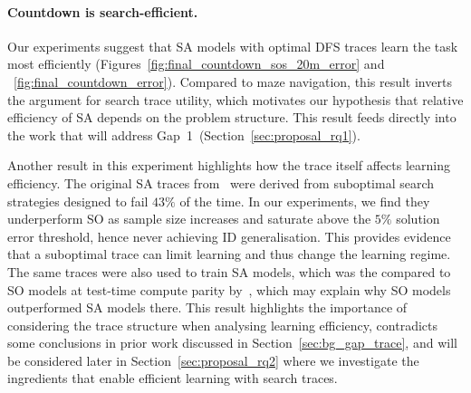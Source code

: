 \paragraph{Countdown is search-efficient.}
Our experiments suggest that SA models with optimal DFS traces learn the task most efficiently (Figures~\ref{fig:final_countdown_sos_20m_error} and ~\ref{fig:final_countdown_error}).
Compared to maze navigation, this result inverts the argument for search trace utility, which motivates our hypothesis that relative efficiency of SA depends on the problem structure.
This result feeds directly into the work that will address Gap~1~(Section~\ref{sec:proposal_rq1}).

Another result in this experiment highlights how the trace itself affects learning efficiency.
The original SA traces from~\citet{gandhiStreamSearchSoS2024} were derived from suboptimal search strategies designed to fail $43\%$ of the time.
In our experiments, we find they underperform SO as sample size increases and saturate above the $5\%$ solution error threshold, hence never achieving ID generalisation.
This provides evidence that a suboptimal trace can limit learning and thus change the learning regime.
The same traces were also used to train SA models, which was the compared to SO models at test-time compute parity by~\citet{qinBacktrackNotBacktrack2025}, which may explain why SO models outperformed SA models there.
This result highlights the importance of considering the trace structure when analysing learning efficiency, contradicts some conclusions in prior work discussed in Section~\ref{sec:bg_gap_trace}, and will be considered later in Section~\ref{sec:proposal_rq2} where we investigate the ingredients that enable efficient learning with search traces.

